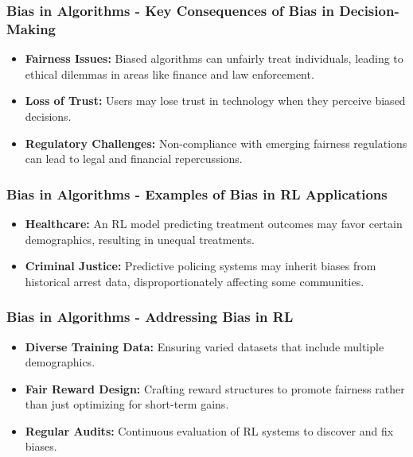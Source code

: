 \documentclass[aspectratio=169]{beamer}
\begin{document}
\begin{frame}[fragile]
  \frametitle{Bias in Algorithms - Key Consequences of Bias in Decision-Making}
  
  \begin{itemize}
      \item \textbf{Fairness Issues:} Biased algorithms can unfairly treat individuals, leading to ethical dilemmas in areas like finance and law enforcement.
      \item \textbf{Loss of Trust:} Users may lose trust in technology when they perceive biased decisions.
      \item \textbf{Regulatory Challenges:} Non-compliance with emerging fairness regulations can lead to legal and financial repercussions.
  \end{itemize}
  
\end{frame}

\begin{frame}[fragile]
  \frametitle{Bias in Algorithms - Examples of Bias in RL Applications}
  
  \begin{itemize}
      \item \textbf{Healthcare:} An RL model predicting treatment outcomes may favor certain demographics, resulting in unequal treatments.
      \item \textbf{Criminal Justice:} Predictive policing systems may inherit biases from historical arrest data, disproportionately affecting some communities.
  \end{itemize}
  
\end{frame}

\begin{frame}[fragile]
  \frametitle{Bias in Algorithms - Addressing Bias in RL}
  
  \begin{itemize}
      \item \textbf{Diverse Training Data:} Ensuring varied datasets that include multiple demographics.
      \item \textbf{Fair Reward Design:} Crafting reward structures to promote fairness rather than just optimizing for short-term gains.
      \item \textbf{Regular Audits:} Continuous evaluation of RL systems to discover and fix biases.
  \end{itemize}
  
\end{frame}
\end{document}
